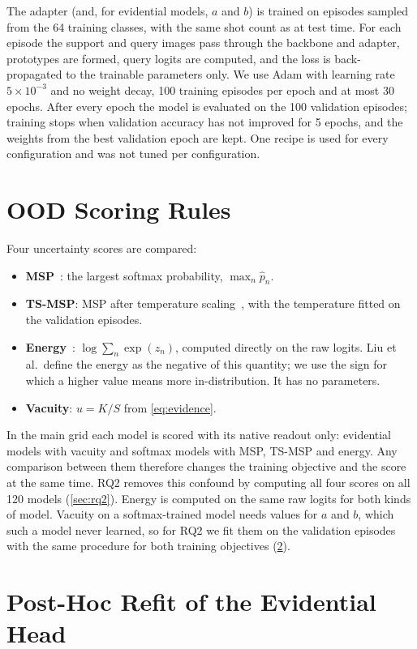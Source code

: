 The adapter (and, for evidential models, $a$ and $b$) is trained on episodes sampled from the 64
training classes, with the same shot count as at test time. For each episode the support and query
images pass through the backbone and adapter, prototypes are formed, query logits are computed, and the
loss is back-propagated to the trainable parameters only. We use Adam with learning rate
$5 \times 10^{-3}$ and no weight decay, 100 training episodes per epoch and at most 30 epochs. After every
epoch the model is evaluated on the 100 validation episodes; training stops when validation accuracy has
not improved for 5 epochs, and the weights from the best validation epoch are kept. One recipe is used
for every configuration and was not tuned per configuration.

\section{OOD Scoring Rules}
\label{sec:scores}

Four uncertainty scores are compared:
\begin{itemize}
\item \textbf{MSP}~\cite{hendrycks2017baseline}: the largest softmax probability, $\max_n \hat p_n$.
\item \textbf{TS-MSP}: MSP after temperature scaling~\cite{guo2017calibration}, with the temperature fitted
on the validation episodes.
\item \textbf{Energy}~\cite{liu2020energy}: $\log \sum_n \exp(z_n)$, computed directly on the raw logits.
Liu et al.\ define the energy as the negative of this quantity; we use the sign for which a higher value
means more in-distribution. It has no parameters.
\item \textbf{Vacuity}: $u = K/S$ from \cref{eq:evidence}.
\end{itemize}
In the main grid each model is scored with its native readout only: evidential models with vacuity and
softmax models with MSP, TS-MSP and energy. Any comparison between them therefore changes the training
objective and the score at the same time. RQ2 removes this confound by computing all four scores on all
120 models (\cref{sec:rq2}). Energy is computed on the same raw logits for both kinds of model. Vacuity on
a softmax-trained model needs values for $a$ and $b$, which such a model never learned, so for RQ2 we fit
them on the validation episodes with the same procedure for both training objectives (\cref{sec:refit}).

\section{Post-Hoc Refit of the Evidential Head}
\label{sec:refit}

